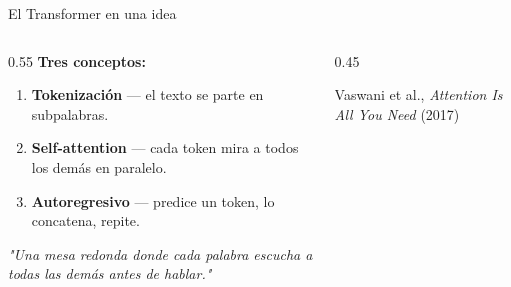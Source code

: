\documentclass[aspectratio=169,11pt]{beamer}
\newcommand{\hl}[1]{\textcolor{mBlue}{\textbf{#1}}}
\begin{document}
\begin{frame}{El Transformer en una idea}
  \small
  \begin{columns}[T]
    \begin{column}{0.55\textwidth}
      \textbf{Tres conceptos:}
      \begin{enumerate}
        \item \hl{Tokenización} — el texto se parte en subpalabras.
        \item \hl{Self-attention} — cada token mira a todos los demás en paralelo.
        \item \hl{Autoregresivo} — predice un token, lo concatena, repite.
      \end{enumerate}
      \vspace{0.3cm}
      \textit{"Una mesa redonda donde cada palabra escucha a todas las demás antes de hablar."}
    \end{column}
    \begin{column}{0.45\textwidth}
      \centering
      \vspace{0.3cm}
      \textcolor{mGray}{\scriptsize Vaswani et al., \textit{Attention Is All You Need} (2017)}
    \end{column}
  \end{columns}
\end{frame}
\end{document}
